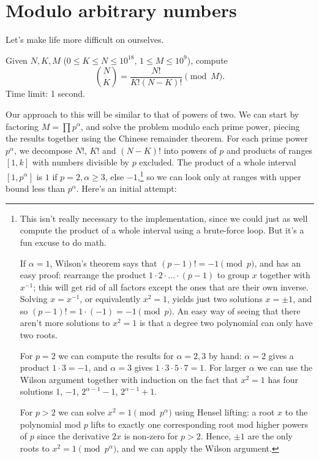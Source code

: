 \section{Modulo arbitrary numbers}

Let's make life more difficult on ourselves.

\begin{framed}
\noindent
Given $N, K, M$ ($0 \le K \le N \le 10^{18}$, $1 \le M \le 10^9$), compute
\[
\binom N K = \frac{N!}{K!(N-K)!} \pmod {M}.
\]
Time limit: 1 second.
\end{framed}

Our approach to this will be similar to that of powers of two.
We can start by factoring $M = \prod p^\alpha$, and solve the problem modulo each prime power, piecing the results together using the Chinese remainder theorem.
For each prime power $p^\alpha$, we decompose $N!$, $K!$ and $(N-K)!$ into powers of $p$ and products of ranges $[1, k]$ with numbers divisible by $p$ excluded.
The product of a whole interval $[1, p^\alpha]$ is $1$ if $p = 2, \alpha \ge 3$, else $-1$,\footnote{
This isn't really necessary to the implementation, since we could just as well compute the product of a whole interval using a brute-force loop. But it's a fun excuse to do math.

If $\alpha = 1$, Wilson's theorem says that $(p-1)! = -1 \pmod{p}$, and has an easy proof: rearrange the product $1 \cdot 2 \cdot \ldots \cdot (p-1)$ to group $x$ together with $x^{-1}$; this will get rid of all factors except the ones that are their own inverse. Solving $x = x^{-1}$, or equivalently $x^2 = 1$, yields just two solutions $x = \pm 1$, and so $(p-1)! = 1 \cdot (-1) = -1\pmod{p}$. An easy way of seeing that there aren't more solutions to $x^2 = 1$ is that a degree two polynomial can only have two roots.

For $p = 2$ we can compute the results for $\alpha = 2, 3$ by hand: $\alpha = 2$ gives a product $1 \cdot 3 = -1$, and $\alpha = 3$ gives $1 \cdot 3 \cdot 5 \cdot 7 = 1$. For larger $\alpha$ we can use the Wilson argument together with induction on the fact that $x^2 = 1$ has four solutions $1$, $-1$, $2^{\alpha-1} - 1$, $2^{\alpha-1} + 1$.

For $p > 2$ we can solve $x^2 = 1 \pmod{p^\alpha}$ using Hensel lifting: a root $x$ to the polynomial mod $p$ lifts to exactly one corresponding root mod higher powers of $p$ since the derivative $2x$ is non-zero for $p > 2$. Hence, $\pm 1$ are the only roots to $x^2 = 1 \pmod{p^\alpha}$, and we can apply the Wilson argument.
}
so we can look only at ranges with upper bound less than $p^\alpha$.
Here's an initial attempt:

